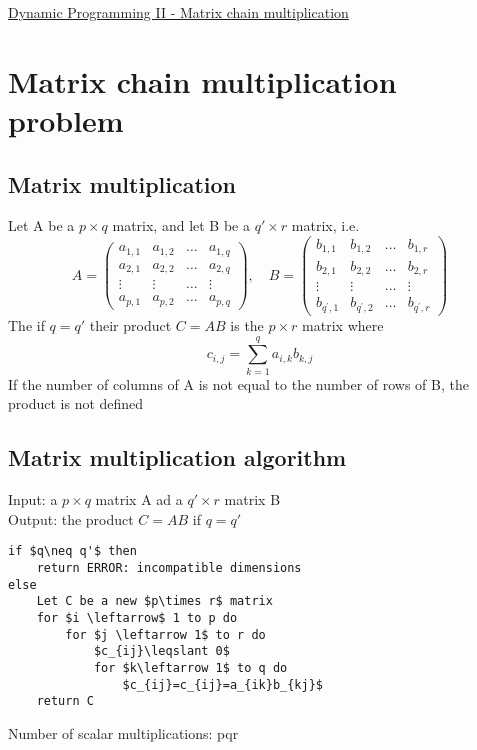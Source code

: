 \documentclass{article}[18pt]
\begin{document}
\begin{center}
\underline{\huge Dynamic Programming II  - Matrix chain multiplication}
\end{center}
\section{Matrix chain multiplication problem}
\subsection{Matrix multiplication}
Let A be a $p\times q$ matrix, and let B be a $q'\times r$ matrix, i.e.
\[
A=\left(\begin{array}{cccc}{a_{1,1}} & {a_{1,2}} & {\dots} & {a_{1, q}} \\ {a_{2,1}} & {a_{2,2}} & {\dots} & {a_{2, q}} \\ {\vdots} & {\vdots} & {\dots} & {\vdots} \\ {a_{p, 1}} & {a_{p, 2}} & {\dots} & {a_{p, q}}\end{array}\right), \quad B=\left(\begin{array}{cccc}{b_{1,1}} & {b_{1,2}} & {\dots} & {b_{1, r}} \\ {b_{2,1}} & {b_{2,2}} & {\dots} & {b_{2, r}} \\ {\vdots} & {\vdots} & {\dots} & {\vdots} \\ {b_{q^{\prime}, 1}} & {b_{q^{\prime}, 2}} & {\dots} & {b_{q^{\prime}, r}}\end{array}\right)
\]
The if $q=q'$ their product $C=AB$ is the $p\times r$ matrix where
\[
c_{i, j}=\sum_{k=1}^{q} a_{i, k} b_{k, j}
\]
If the number of columns of A is not equal to the number of rows of B, the product is not defined
\subsection{Matrix multiplication algorithm}
Input: a $p\times q$ matrix A ad a $q'\times r$ matrix B\\
Output: the product $C=AB$ if $q=q'$
\begin{lstlisting}[caption=Multiply({A,B})]
if $q\neq q'$ then
	return ERROR: incompatible dimensions
else
	Let C be a new $p\times r$ matrix
	for $i \leftarrow$ 1 to p do
		for $j \leftarrow 1$ to r do
			$c_{ij}\leqslant 0$
			for $k\leftarrow 1$ to q do
				$c_{ij}=c_{ij}=a_{ik}b_{kj}$
	return C
\end{lstlisting}
Number of scalar multiplications: pqr
\end{document}
